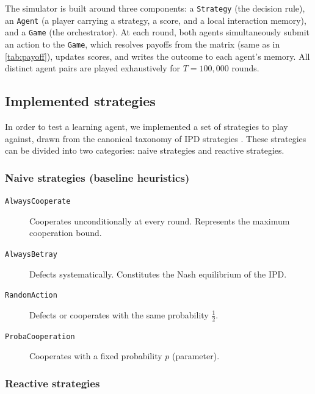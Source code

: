 \documentclass[11pt, a4paper]{article}
\begin{document}
The simulator is built around three components: a \texttt{Strategy} (the decision rule), an \texttt{Agent} (a player carrying a strategy, a score, and a local interaction memory), and a \texttt{Game} (the orchestrator). At each round, both agents simultaneously submit an action to the \texttt{Game}, which resolves payoffs from the matrix (same as in \ref{tab:payoff}), updates scores, and writes the outcome to each agent's memory. All distinct agent pairs are played exhaustively for $T = 100{,}000$ rounds.

\subsection{Implemented strategies}

In order to test a learning agent, we implemented a set of strategies to play against, drawn from the canonical taxonomy of IPD strategies \citep{kuhn2019sep}. These strategies can be divided into two categories: naive strategies and reactive strategies.

\subsubsection{Naive strategies (baseline heuristics)}

\begin{description}
  \item[\texttt{AlwaysCooperate}] Cooperates unconditionally at every round. Represents the maximum cooperation bound.
  \item[\texttt{AlwaysBetray}] Defects systematically. Constitutes the Nash equilibrium of the IPD.
  \item[\texttt{RandomAction}] Defects or cooperates with the same probability $\frac{1}{2}$.
  \item[\texttt{ProbaCooperation}] Cooperates with a fixed probability $p$ (parameter).
\end{description}

\subsubsection{Reactive strategies}
\end{document}
